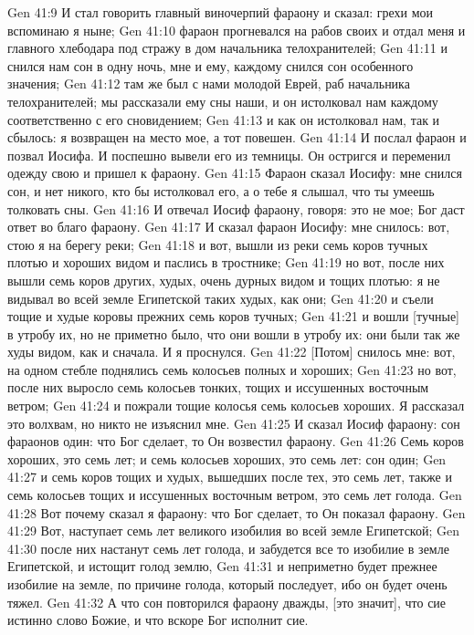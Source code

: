 Gen 41:9  И стал говорить главный виночерпий фараону и сказал: грехи мои вспоминаю я ныне;
Gen 41:10  фараон прогневался на рабов своих и отдал меня и главного хлебодара под стражу в дом начальника телохранителей;
Gen 41:11  и снился нам сон в одну ночь, мне и ему, каждому снился сон особенного значения;
Gen 41:12  там же был с нами молодой Еврей, раб начальника телохранителей; мы рассказали ему сны наши, и он истолковал нам каждому соответственно с его сновидением;
Gen 41:13  и как он истолковал нам, так и сбылось: я возвращен на место мое, а тот повешен.
Gen 41:14  И послал фараон и позвал Иосифа. И поспешно вывели его из темницы. Он остригся и переменил одежду свою и пришел к фараону.
Gen 41:15  Фараон сказал Иосифу: мне снился сон, и нет никого, кто бы истолковал его, а о тебе я слышал, что ты умеешь толковать сны.
Gen 41:16  И отвечал Иосиф фараону, говоря: это не мое; Бог даст ответ во благо фараону.
Gen 41:17  И сказал фараон Иосифу: мне снилось: вот, стою я на берегу реки;
Gen 41:18  и вот, вышли из реки семь коров тучных плотью и хороших видом и паслись в тростнике;
Gen 41:19  но вот, после них вышли семь коров других, худых, очень дурных видом и тощих плотью: я не видывал во всей земле Египетской таких худых, как они;
Gen 41:20  и съели тощие и худые коровы прежних семь коров тучных;
Gen 41:21  и вошли [тучные] в утробу их, но не приметно было, что они вошли в утробу их: они были так же худы видом, как и сначала. И я проснулся.
Gen 41:22  [Потом] снилось мне: вот, на одном стебле поднялись семь колосьев полных и хороших;
Gen 41:23  но вот, после них выросло семь колосьев тонких, тощих и иссушенных восточным ветром;
Gen 41:24  и пожрали тощие колосья семь колосьев хороших. Я рассказал это волхвам, но никто не изъяснил мне.
Gen 41:25  И сказал Иосиф фараону: сон фараонов один: что Бог сделает, то Он возвестил фараону.
Gen 41:26  Семь коров хороших, это семь лет; и семь колосьев хороших, это семь лет: сон один;
Gen 41:27  и семь коров тощих и худых, вышедших после тех, это семь лет, также и семь колосьев тощих и иссушенных восточным ветром, это семь лет голода.
Gen 41:28  Вот почему сказал я фараону: что Бог сделает, то Он показал фараону.
Gen 41:29  Вот, наступает семь лет великого изобилия во всей земле Египетской;
Gen 41:30  после них настанут семь лет голода, и забудется все то изобилие в земле Египетской, и истощит голод землю,
Gen 41:31  и неприметно будет прежнее изобилие на земле, по причине голода, который последует, ибо он будет очень тяжел.
Gen 41:32  А что сон повторился фараону дважды, [это значит], что сие истинно слово Божие, и что вскоре Бог исполнит сие.
